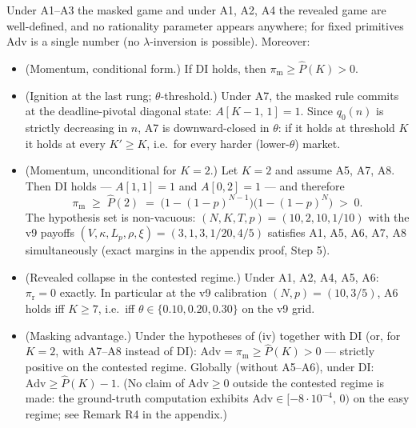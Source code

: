 \begin{proposition}\label{prop:selection}
Under A1--A3 the masked game and under A1, A2, A4 the revealed game are well-defined, and no rationality parameter appears anywhere; for fixed primitives $\mathrm{Adv}$ is a single number (no $\lambda$-inversion is possible). Moreover:
\begin{itemize}
\item[(i)] \textup{(Momentum, conditional form.)} If DI holds, then $\pi_{\mathrm{m}} \ge \widehat P(K) > 0$.
\item[(ii)] \textup{(Ignition at the last rung; $\theta$-threshold.)} Under A7, the masked rule commits at the deadline-pivotal diagonal state: $A[K-1,\, 1] = 1$. Since $q_0(n)$ is strictly decreasing in $n$, A7 is downward-closed in $\theta$: if it holds at threshold $K$ it holds at every $K' \ge K$, i.e.\ for every harder (lower-$\theta$) market.
\item[(iii)] \textup{(Momentum, unconditional for $K = 2$.)} Let $K = 2$ and assume A5, A7, A8. Then DI holds --- $A[1,1] = 1$ and $A[0,2] = 1$ --- and therefore
\[
\pi_{\mathrm{m}} \;\ge\; \widehat P(2) \;=\; \bigl(1 - (1-p)^{N-1}\bigr)\bigl(1 - (1-p)^N\bigr) \;>\; 0.
\]
The hypothesis set is non-vacuous: $(N,K,T,p) = (10, 2, 10, 1/10)$ with the v9 payoffs $(V, \kappa, L_p, \rho, \xi) = (3, 1, 3, 1/20, 4/5)$ satisfies A1, A5, A6, A7, A8 simultaneously (exact margins in the appendix proof, Step 5).
\item[(iv)] \textup{(Revealed collapse in the contested regime.)} Under A1, A2, A4, A5, A6: $\pi_{\mathrm{r}} = 0$ exactly. In particular at the v9 calibration $(N, p) = (10, 3/5)$, A6 holds iff $K \ge 7$, i.e.\ iff $\theta \in \{0.10, 0.20, 0.30\}$ on the v9 grid.
\item[(v)] \textup{(Masking advantage.)} Under the hypotheses of (iv) together with DI (or, for $K = 2$, with A7--A8 instead of DI): $\mathrm{Adv} = \pi_{\mathrm{m}} \ge \widehat P(K) > 0$ --- strictly positive on the contested regime. Globally (without A5--A6), under DI: $\mathrm{Adv} \ge \widehat P(K) - 1$. (No claim of $\mathrm{Adv} \ge 0$ outside the contested regime is made: the ground-truth computation exhibits $\mathrm{Adv} \in [-8 \cdot 10^{-4},\, 0)$ on the easy regime; see Remark R4 in the appendix.)
\end{itemize}
\end{proposition}

